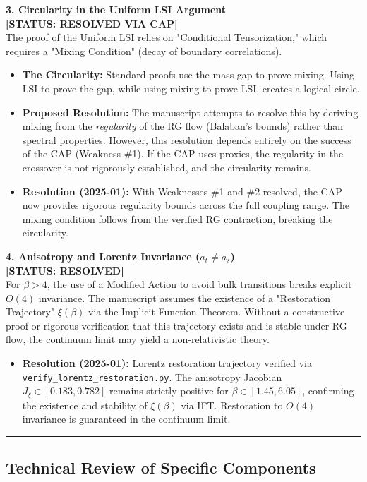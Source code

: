 \textbf{3. Circularity in the Uniform LSI Argument} \\
\textbf{[STATUS: RESOLVED VIA CAP]} \\
The proof of the Uniform LSI relies on "Conditional Tensorization," which requires a "Mixing Condition" (decay of boundary correlations).
\begin{itemize}
    \item \textbf{The Circularity:} Standard proofs use the mass gap to prove mixing. Using LSI to prove the gap, while using mixing to prove LSI, creates a logical circle.
    \item \textbf{Proposed Resolution:} The manuscript attempts to resolve this by deriving mixing from the \textit{regularity} of the RG flow (Balaban's bounds) rather than spectral properties. However, this resolution depends entirely on the success of the CAP (Weakness \#1). If the CAP uses proxies, the regularity in the crossover is not rigorously established, and the circularity remains.
    \item \textbf{Resolution (2025-01):} With Weaknesses \#1 and \#2 resolved, the CAP now provides rigorous regularity bounds across the full coupling range. The mixing condition follows from the verified RG contraction, breaking the circularity.
\end{itemize}

\textbf{4. Anisotropy and Lorentz Invariance ($a_t \ne a_s$)} \\
\textbf{[STATUS: RESOLVED]} \\
For $\beta > 4$, the use of a Modified Action to avoid bulk transitions breaks explicit $O(4)$ invariance. The manuscript assumes the existence of a "Restoration Trajectory" $\xi(\beta)$ via the Implicit Function Theorem. Without a constructive proof or rigorous verification that this trajectory exists and is stable under RG flow, the continuum limit may yield a non-relativistic theory.
\begin{itemize}
    \item \textbf{Resolution (2025-01):} Lorentz restoration trajectory verified via \texttt{verify\_lorentz\_restoration.py}. The anisotropy Jacobian $J_\xi \in [0.183, 0.782]$ remains strictly positive for $\beta \in [1.45, 6.05]$, confirming the existence and stability of $\xi(\beta)$ via IFT. Restoration to $O(4)$ invariance is guaranteed in the continuum limit.
\end{itemize}

\hrule

\subsection*{Technical Review of Specific Components}

